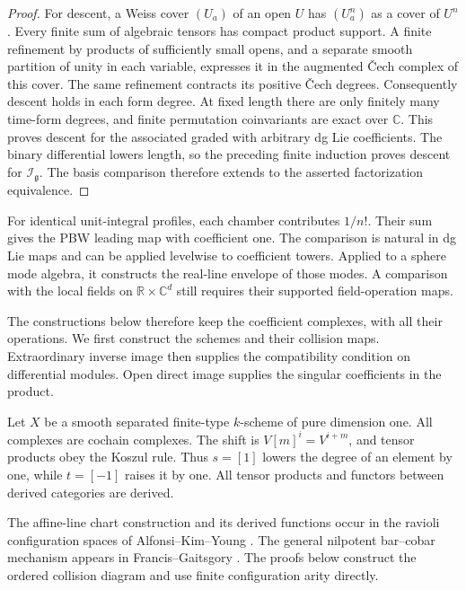 \begin{proof}
For descent, a Weiss cover \((U_a)\) of an open \(U\) has
\((U_a^n)\) as a cover of \(U^n\). Every finite sum of algebraic
tensors has compact product support. A finite refinement by products
of sufficiently small opens, and a separate smooth partition of unity
in each variable, expresses it in the augmented \v{C}ech complex of this
cover. The same refinement contracts its positive \v{C}ech degrees.
Consequently descent holds in each form degree. At fixed length there
are only finitely many time-form degrees, and finite permutation
coinvariants are exact over \(\mathbb C\). This proves descent for
the associated graded with arbitrary dg Lie coefficients. The binary
differential lowers length, so the preceding finite induction proves
descent for \(\mathcal I_{\mathfrak g}\). The basis comparison
therefore extends to the asserted factorization equivalence.
\end{proof}

For identical unit-integral profiles, each chamber contributes
\(1/n!\). Their sum gives the PBW leading map with coefficient one.
The comparison is natural in dg Lie maps and can be applied levelwise
to coefficient towers. Applied to a sphere mode algebra, it constructs
the real-line envelope of those modes. A comparison with the local
fields on \(\mathbb R\times\mathbb C^d\) still requires their
supported field-operation maps.

The constructions below therefore keep the coefficient complexes, with all their operations.
We first construct the schemes and their collision maps.
Extraordinary inverse image then supplies the compatibility condition on differential modules.
Open direct image supplies the singular coefficients in the product.

Let\label{ogd:def:atlas-curve-and-grading} \(X\) be a smooth separated finite-type \(k\)-scheme of pure dimension one.
All complexes are cochain complexes.
The shift is \(V[m]^i=V^{i+m}\), and tensor products obey the Koszul rule.
Thus \(s=[1]\) lowers the degree of an element by one, while \(t=[-1]\) raises it by one.
All tensor products and functors between derived categories are derived.

The affine-line chart construction and its derived functions occur in the ravioli configuration spaces of Alfonsi--Kim--Young .
The general nilpotent bar--cobar mechanism appears in Francis--Gaitsgory .
The proofs below construct the ordered collision diagram and use finite configuration arity directly.

